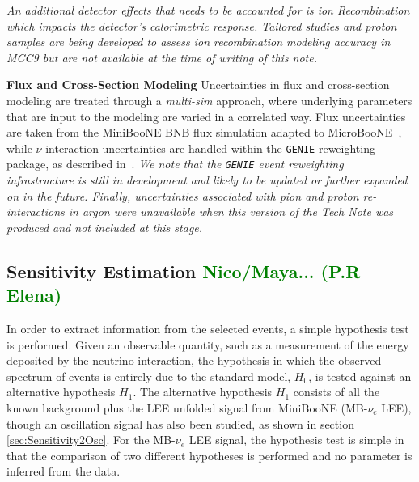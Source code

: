 \documentclass[a4paper]{article}
\begin{document}
\emph{An additional detector effects that needs to be accounted for is ion Recombination which impacts the detector's calorimetric response. Tailored studies and proton samples are being developed to assess ion recombination modeling accuracy in MCC9 but are not available at the time of writing of this note.}
\par \noindent \textbf{Flux and Cross-Section Modeling} Uncertainties in flux and cross-section modeling are treated through a \emph{multi-sim} approach, where underlying parameters that are input to the modeling are varied in a correlated way. Flux uncertainties are taken from the MiniBooNE BNB flux simulation adapted to MicroBooNE~\cite{bib:fluxmcc9,bib:fluxtechnote}, while $\nu$ interaction uncertainties are handled within the \texttt{GENIE} reweighting package, as described in~\cite{bib:geniesupportnote}. \emph{We note that the \texttt{GENIE} event reweighting infrastructure is still in development and likely to be updated or further expanded on in the future. Finally, uncertainties associated with pion and proton re-interactions in argon were unavailable when this version of the Tech Note was produced and not included at this stage.} 

\subsection{Sensitivity Estimation \textcolor{green}{Nico/Maya... (P.R Elena)}}
In order to extract information from the selected events, a simple hypothesis test is performed.
Given an observable quantity, such as a measurement of the energy deposited by the neutrino interaction, the hypothesis in which the observed spectrum of events is entirely due to the standard model, $H_0$, is tested against an alternative hypothesis $H_1$.
The alternative hypothesis $H_1$ consists of all the known background plus the LEE unfolded signal from MiniBooNE (MB-$\nu_e$ LEE), though an oscillation signal has also been studied, as shown in section \ref{sec:Sensitivity2Osc}.
For the MB-$\nu_e$ LEE signal, the hypothesis test is simple in that the comparison of two different hypotheses is performed and no parameter is inferred from the data.

\end{document}
